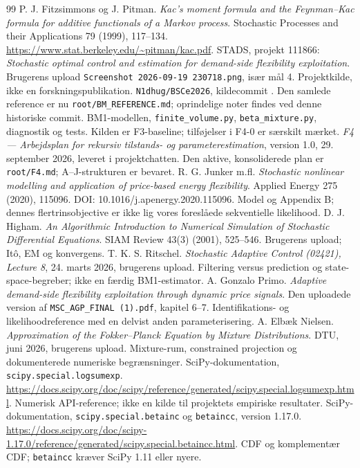 \begingroup
\raggedright
\begin{thebibliography}{99}
 P. J. Fitzsimmons og J. Pitman.
\emph{Kac's moment formula and the Feynman--Kac formula for additive
functionals of a Markov process}. Stochastic Processes and their Applications
79 (1999), 117--134. \url{https://www.stat.berkeley.edu/~pitman/kac.pdf}.
 STADS, projekt 111866: \emph{Stochastic optimal control and estimation for demand-side flexibility exploitation}. Brugerens upload \texttt{Screenshot 2026-09-19 230718.png}, især mål 4. Projektkilde, ikke en forskningspublikation.
 \texttt{N1dhug/BSCe2026}, kildecommit \basecommit. Den samlede reference er nu \texttt{root/BM\_REFERENCE.md}; oprindelige noter findes ved denne historiske commit. BM1-modellen, \texttt{finite\_volume.py}, \texttt{beta\_mixture.py}, diagnostik og tests. Kilden er F3-baseline; tilføjelser i F4-0 er særskilt mærket.
 \emph{F4 --- Arbejdsplan for rekursiv tilstands- og parameterestimation}, version 1.0, 29. september 2026, leveret i projektchatten. Den aktive, konsoliderede plan er \texttt{root/F4.md}; A--J-strukturen er bevaret.
 R. G. Junker m.fl. \emph{Stochastic nonlinear modelling and application of price-based energy flexibility}. Applied Energy 275 (2020), 115096. DOI: 10.1016/j.apenergy.2020.115096. Model og Appendix B; dennes flertrinsobjective er ikke lig vores foreslåede sekventielle likelihood.
 D. J. Higham. \emph{An Algorithmic Introduction to Numerical Simulation of Stochastic Differential Equations}. SIAM Review 43(3) (2001), 525--546. Brugerens upload; Itô, EM og konvergens.
 T. K. S. Ritschel. \emph{Stochastic Adaptive Control (02421), Lecture 8}, 24. marts 2026, brugerens upload. Filtering versus prediction og state-space-begreber; ikke en færdig BM1-estimator.
 A. Gonzalo Primo. \emph{Adaptive demand-side flexibility exploitation through dynamic price signals}. Den uploadede version af \texttt{MSC\_AGP\_FINAL (1).pdf}, kapitel 6--7. Identifikations- og likelihoodreference med en delvist anden parameterisering.
 A. Elbæk Nielsen. \emph{Approximation of the Fokker--Planck Equation by Mixture Distributions}. DTU, juni 2026, brugerens upload. Mixture-rum, constrained projection og dokumenterede numeriske begrænsninger.
 SciPy-dokumentation, \texttt{scipy.special.logsumexp}. \url{https://docs.scipy.org/doc/scipy/reference/generated/scipy.special.logsumexp.html}. Numerisk API-reference; ikke en kilde til projektets empiriske resultater.
 SciPy-dokumentation, \texttt{scipy.special.betainc} og \texttt{betaincc}, version 1.17.0. \url{https://docs.scipy.org/doc/scipy-1.17.0/reference/generated/scipy.special.betaincc.html}. CDF og komplementær CDF; \texttt{betaincc} kræver SciPy 1.11 eller nyere.
\end{thebibliography}
\endgroup
